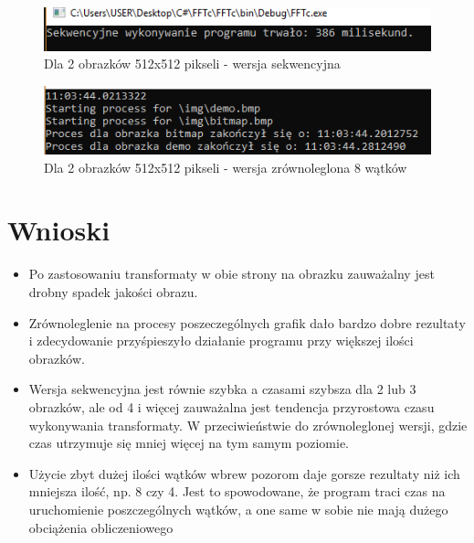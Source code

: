 \begin{figure}[ht]
	\includegraphics[width=\textwidth]{figures/Seq2.png}
	\centering
	\caption{Dla 2 obrazków 512x512 pikseli - wersja sekwencyjna}
\end{figure}
\begin{figure}[ht]
	\includegraphics[width=\textwidth]{figures/Par2Wat8.png}
	\centering
	\caption{Dla 2 obrazków 512x512 pikseli - wersja zrównoleglona 8 wątków}
\end{figure}

\clearpage\newpage
\section{Wnioski}
\begin{itemize}
	\item Po zastosowaniu transformaty w obie strony na obrazku zauważalny jest drobny spadek jakości obrazu.
	\item Zrównoleglenie na procesy poszeczególnych grafik dało bardzo dobre rezultaty i zdecydowanie przyśpieszyło działanie programu przy większej ilości obrazków.
	\item Wersja sekwencyjna jest równie szybka a czasami szybsza dla 2 lub 3 obrazków, ale od 4 i więcej zauważalna jest tendencja przyrostowa czasu wykonywania transformaty. W przeciwieństwie do zrównoleglonej wersji, gdzie czas utrzymuje się mniej więcej na tym samym poziomie.
	\item Użycie zbyt dużej ilości wątków wbrew pozorom daje gorsze rezultaty niż ich mniejsza ilość, np. 8 czy 4. Jest to spowodowane, że program traci czas na uruchomienie poszczególnych wątków, a one same w sobie nie mają dużego obciążenia obliczeniowego
\end{itemize}

